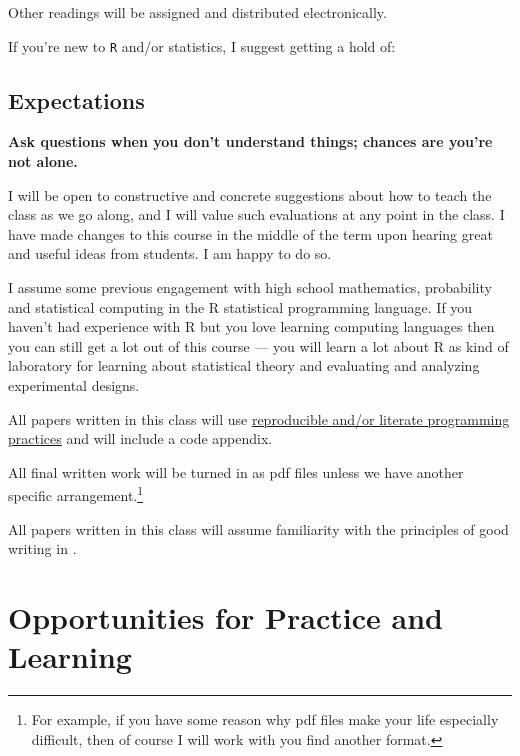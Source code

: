 \documentclass[10pt]{article}
\newenvironment{introstuff} {\setcounter{secnumdepth}{0}} {\setcounter{secnumdepth}{1}}
\begin{document}
\begin{introstuff}
Other readings will be assigned and distributed electronically.

If you're new to \texttt{R} and/or statistics, I suggest getting a hold of:
\begin{verse}

\end{verse}

\subsection{Expectations}

\textbf{Ask questions when you don't understand things; chances are you're not
alone.}

        I will be open to constructive and concrete suggestions about how to
        teach the class as we go along, and I will value such evaluations at any
        point in the class. I have made changes to this course in the middle of
        the term upon hearing great and useful ideas from students. I am happy
        to do so.

        I assume some previous engagement with high school mathematics,
        probability and statistical computing in the R statistical programming
        language. If you haven't had experience with R but you love learning
        computing languages then you can still get a lot out of this course ---
        you will learn a lot about R as kind of laboratory for learning about
        statistical theory and evaluating and analyzing experimental designs.

        All papers written in this class will use
        \href{http://www.jakebowers.org/PAPERS/11-BOWERS-RCP-363.pdf}{reproducible
        and/or literate programming practices} \parencite{bowers2016future} and
        will include a code appendix.

	All final written work will be turned in as pdf files unless we have
	another specific arrangement.\footnote{For example, if you have some
	reason why pdf files make your life especially difficult, then of course I will work with you find another format.}

        All papers written in this class will assume familiarity with the
        principles of good writing in \textcite{beck:1986}.

        \section{Opportunities for Practice and Learning}


\end{introstuff}
\end{document}
